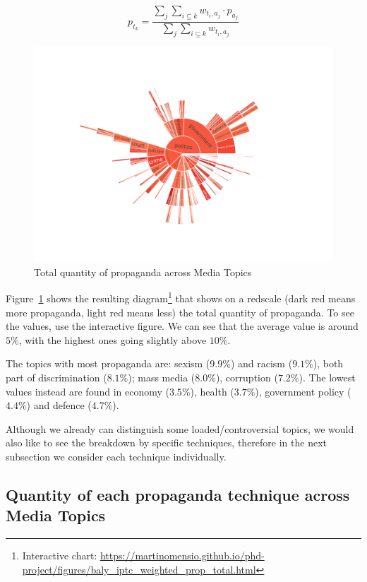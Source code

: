 $$ p_{t_{k}} = \frac{ \sum_{j} \sum_{i\subseteq k} w_{t_{i},a_{j}} \cdot p_{a_{j}} }{ \sum_{j} \sum_{i\subseteq k} w_{t_{i},a_{j}} } $$

\begin{figure}[!htbp]
    \centering
    \includegraphics[trim={2.2cm 2cm 2.2cm 2cm},clip,width=\linewidth]{figures/baly_iptc_weighted_prop_total.pdf}
    \caption{Total quantity of propaganda across Media Topics}
    \label{fig:baly_iptc_weighted_prop_total}
\end{figure}

Figure~\ref{fig:baly_iptc_weighted_prop_total} shows the resulting diagram\footnote{Interactive chart: \url{https://martinomensio.github.io/phd-project/figures/baly_iptc_weighted_prop_total.html}} that shows on a redscale (dark red means more propaganda, light red means less) the total quantity of propaganda. To see the values, use the interactive figure.
We can see that the average value is around $5\%$, with the highest ones going slightly above $10\%$.

The topics with most propaganda are: sexism ($9.9\%$) and racism ($9.1\%$), both part of discrimination ($8.1\%$); mass media ($8.0\%$), corruption ($7.2\%$). The lowest values instead are found in economy ($3.5\%$), health ($3.7\%$), government policy ($4.4\%$) and defence ($4.7\%$).

Although we already can distinguish some loaded/controversial topics, we would also like to see the breakdown by specific techniques, therefore in the next subsection we consider each technique individually.

\subsection{Quantity of each propaganda technique across Media Topics}
\label{sec:topic_propaganda_tech}

